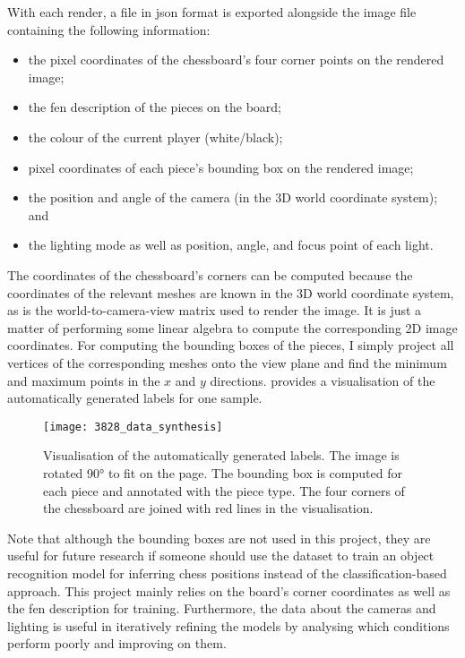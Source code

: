 \documentclass[../report.tex]{subfiles}
\begin{document}
With each render, a file in \gls{json} format is exported alongside the image file containing the following information:
\begin{itemize}
    \item the pixel coordinates of the chessboard's four corner points on the rendered image;
    \item the \gls{fen} description of the pieces on the board;
    \item the colour of the current player (white/black);
    \item pixel coordinates of each piece's bounding box on the rendered image;
    \item the position and angle of the camera (in the 3D world coordinate system); and
    \item the lighting mode as well as position, angle, and focus point of each light.
\end{itemize}
The coordinates of the chessboard's corners can be computed because the coordinates of the relevant meshes are known in the 3D world coordinate system, as is the world-to-camera-view matrix used to render the image.
It is just a matter of performing some linear algebra to compute the corresponding 2D image coordinates.
For computing the bounding boxes of the pieces, I simply project all vertices of the corresponding meshes onto the view plane and find the minimum and maximum points in the $x$ and $y$ directions.
 provides a visualisation of the automatically generated labels for one sample.
\begin{figure}
    \centering
    \texttt{[image: 3828\_data\_synthesis]}
    \caption[Visualisation of the automatically generated labels.]{Visualisation of the automatically generated labels. The image is rotated 90° to fit on the page. The bounding box is computed for each piece and annotated with the piece type. The four corners of the chessboard are joined with red lines in the visualisation.}
    \label{fig:data_synthesis_visualisation}
\end{figure}
Note that although the bounding boxes are not used in this project, they are useful for future research if someone should use the dataset to train an object recognition model for inferring chess positions instead of the classification-based approach.
This project mainly relies on the board's corner coordinates as well as the \gls{fen} description for training.
Furthermore, the data about the cameras and lighting is useful in iteratively refining the models by analysing which conditions perform poorly and improving on them.
\end{document}

